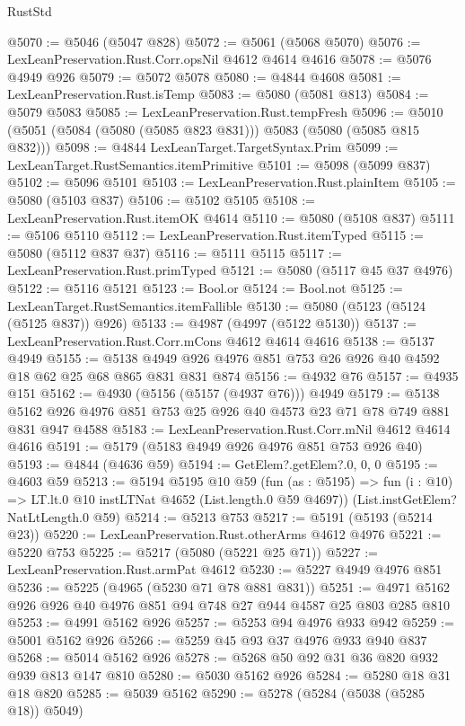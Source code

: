 \begin{lexlean}{RustStd}
\begin{coremodule}
@5070 := @5046 (@5047 @828)
@5072 := @5061 (@5068 @5070)
@5076 := LexLeanPreservation.Rust.Corr.opsNil @4612 @4614 @4616
@5078 := @5076 @4949 @926
@5079 := @5072 @5078
@5080 := @4844 @4608
@5081 := LexLeanPreservation.Rust.isTemp
@5083 := @5080 (@5081 @813)
@5084 := @5079 @5083
@5085 := LexLeanPreservation.Rust.tempFresh
@5096 := @5010 (@5051 (@5084 (@5080 (@5085 @823 @831))) @5083 (@5080 (@5085 @815 @832)))
@5098 := @4844 LexLeanTarget.TargetSyntax.Prim
@5099 := LexLeanTarget.RustSemantics.itemPrimitive
@5101 := @5098 (@5099 @837)
@5102 := @5096 @5101
@5103 := LexLeanPreservation.Rust.plainItem
@5105 := @5080 (@5103 @837)
@5106 := @5102 @5105
@5108 := LexLeanPreservation.Rust.itemOK @4614
@5110 := @5080 (@5108 @837)
@5111 := @5106 @5110
@5112 := LexLeanPreservation.Rust.itemTyped
@5115 := @5080 (@5112 @837 @37)
@5116 := @5111 @5115
@5117 := LexLeanPreservation.Rust.primTyped
@5121 := @5080 (@5117 @45 @37 @4976)
@5122 := @5116 @5121
@5123 := Bool.or
@5124 := Bool.not
@5125 := LexLeanTarget.RustSemantics.itemFallible
@5130 := @5080 (@5123 (@5124 (@5125 @837)) @926)
@5133 := @4987 (@4997 (@5122 @5130))
@5137 := LexLeanPreservation.Rust.Corr.mCons @4612 @4614 @4616
@5138 := @5137 @4949
@5155 := @5138 @4949 @926 @4976 @851 @753 @26 @926 @40 @4592 @18 @62 @25 @68 @865 @831 @831 @874
@5156 := @4932 @76
@5157 := @4935 @151
@5162 := @4930 (@5156 (@5157 (@4937 @76))) @4949
@5179 := @5138 @5162 @926 @4976 @851 @753 @25 @926 @40 @4573 @23 @71 @78 @749 @881 @831 @947 @4588
@5183 := LexLeanPreservation.Rust.Corr.mNil @4612 @4614 @4616
@5191 := @5179 (@5183 @4949 @926 @4976 @851 @753 @926 @40)
@5193 := @4844 (@4636 @59)
@5194 := GetElem?.getElem?.{0, 0, 0}
@5195 := @4603 @59
@5213 := @5194
    @5195
    @10
    @59
    (fun (as : @5195) => fun (i : @10) => LT.lt.{0} @10 instLTNat @4652 (List.length.{0} @59 @4697))
    (List.instGetElem?NatLtLength.{0} @59)
@5214 := @5213 @753
@5217 := @5191 (@5193 (@5214 @23))
@5220 := LexLeanPreservation.Rust.otherArms @4612 @4976
@5221 := @5220 @753
@5225 := @5217 (@5080 (@5221 @25 @71))
@5227 := LexLeanPreservation.Rust.armPat @4612
@5230 := @5227 @4949 @4976 @851
@5236 := @5225 (@4965 (@5230 @71 @78 @881 @831))
@5251 := @4971 @5162 @926 @926 @40 @4976 @851 @94 @748 @27 @944 @4587 @25 @803 @285 @810
@5253 := @4991 @5162 @926
@5257 := @5253 @94 @4976 @933 @942
@5259 := @5001 @5162 @926
@5266 := @5259 @45 @93 @37 @4976 @933 @940 @837
@5268 := @5014 @5162 @926
@5278 := @5268 @50 @92 @31 @36 @820 @932 @939 @813 @147 @810
@5280 := @5030 @5162 @926
@5284 := @5280 @18 @31 @18 @820
@5285 := @5039 @5162
@5290 := @5278 (@5284 (@5038 (@5285 @18)) @5049)

\end{coremodule}
\end{lexlean}
